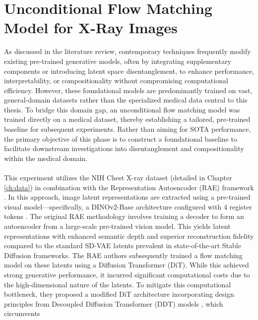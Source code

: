 \chapter{Unconditional Flow Matching Model for X-Ray Images}\label{ch:exp1}

As discussed in the literature review, contemporary techniques frequently modify existing pre-trained generative models, often by 
integrating supplementary components or introducing latent space disentanglement, to enhance performance, interpretability, or 
compositionality without compromising computational efficiency. However, these foundational models are predominantly trained on 
vast, general-domain datasets rather than the specialized medical data central to this thesis. To bridge this domain gap, an 
unconditional flow matching model was trained directly on a medical dataset, thereby establishing a tailored, pre-trained baseline 
for subsequent experiments. Rather than aiming for SOTA performance, the primary objective of this phase is 
to construct a foundational baseline to facilitate downstream investigations into disentanglement and compositionality within 
the medical domain. \\
\\
This experiment utilizes the NIH Chest X-ray dataset (detailed in Chapter \ref{ch:data}) in combination with the Representation Autoencoder 
(RAE) framework \cite{zheng2025diffusiontransformersrepresentationautoencoders}. In this approach, image latent representations are 
extracted using a pre-trained visual model—specifically, a DINOv2-Base architecture configured with 4 register tokens 
\cite{oquab2024dinov2learningrobustvisual,darcet2024visiontransformersneedregisters}. The original RAE methodology involves training 
a decoder to form an autoencoder from a large-scale pre-trained vision model. This yields latent representations with enhanced 
semantic depth and superior reconstruction fidelity compared to the standard SD-VAE latents prevalent in state-of-the-art Stable 
Diffusion frameworks. The RAE authors subsequently trained a flow matching model on these latents using a Diffusion Transformer 
(DiT). While this achieved strong generative performance, it incurred significant computational costs due to the high-dimensional 
nature of the latents. To mitigate this computational bottleneck, they proposed a modified DiT architecture incorporating design 
principles from Decoupled Diffusion Transformer (DDT) models \cite{wang2025ddtdecoupleddiffusiontransformer}, which circumvents 
